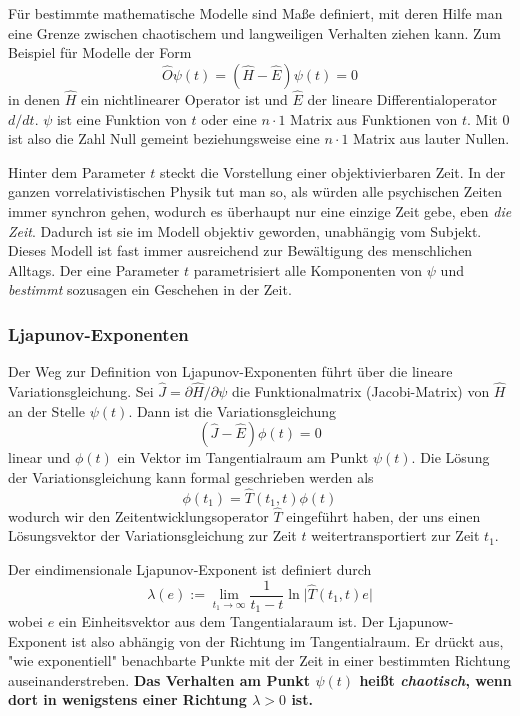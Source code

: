 \documentclass[12pt]{book}
\begin{document}
Für bestimmte mathematische Modelle sind Maße definiert, mit deren Hilfe man eine Grenze zwischen chaotischem und langweiligen Verhalten ziehen kann. Zum Beispiel für Modelle der Form
\begin{equation} 
\hat{O}\psi(t) = (\hat{H} - \hat{E}) \psi(t) = 0
\label{eq:nonlinear_equality}
\end{equation}
in denen $\hat{H}$ ein nichtlinearer Operator ist und $\hat{E}$ der lineare Differentialoperator $d/dt$. $\psi$ ist eine Funktion von $t$ oder eine $n \cdot 1$ Matrix aus Funktionen von $t$. Mit $0$ ist also die Zahl Null gemeint beziehungsweise eine $n \cdot 1$ Matrix aus lauter Nullen.

Hinter dem Parameter $t$ steckt die Vorstellung einer objektivierbaren Zeit. In der ganzen vorrelativistischen Physik tut man so, als würden alle psychischen Zeiten immer synchron gehen, wodurch es überhaupt nur eine einzige Zeit gebe, eben \emph{die Zeit}. Dadurch ist sie im Modell objektiv geworden, unabhängig vom Subjekt. Dieses Modell ist fast immer ausreichend zur Bewältigung des menschlichen Alltags. Der eine Parameter $t$ parametrisiert alle Komponenten von $\psi$ und \emph{bestimmt} sozusagen ein Geschehen in der Zeit.

\subsubsection{Ljapunov-Exponenten}

Der Weg zur Definition von Ljapunov-Exponenten führt über die lineare Variationsgleichung. Sei $\hat{J} = \partial \hat{H} / \partial \psi$ die Funktionalmatrix (Jacobi-Matrix) von $\hat{H}$ an der Stelle $\psi(t)$. Dann ist die Variationsgleichung
\begin{equation*} 
(\hat{J} - \hat{E}) \phi(t) = 0
\end{equation*}
linear und $\phi(t)$ ein Vektor im Tangentialraum am Punkt $\psi(t)$. Die Lösung der Variationsgleichung kann formal geschrieben werden als 
\begin{equation*} 
\phi(t_1) = \hat{T}(t_1,t) \phi(t)
\end{equation*}
wodurch wir den Zeitentwicklungsoperator $\hat{T}$ eingeführt haben, der uns einen Lösungsvektor der Variationsgleichung zur Zeit $t$ weitertransportiert zur Zeit $t_1$. 

Der eindimensionale Ljapunov-Exponent ist definiert durch 
\begin{equation} 
\lambda(e) := \lim_{t_1 \to \infty} \frac{1}{t_1-t} \ln {|\hat{T}(t_1,t) e}| 
\label{eq:ljapunov_exponent}
\end{equation}
wobei $e$ ein Einheitsvektor aus dem Tangentialaraum ist. Der Ljapunow-Exponent ist also abhängig von der Richtung im Tangentialraum. Er drückt aus, "wie exponentiell" benachbarte Punkte mit der Zeit in einer bestimmten Richtung auseinanderstreben. \textbf{Das Verhalten am Punkt $\psi(t)$ heißt \emph{chaotisch}, wenn dort in wenigstens einer Richtung $\lambda > 0$ ist.}
\end{document}
